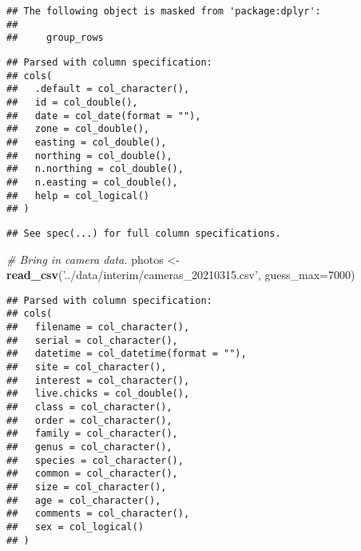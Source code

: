 \documentclass[
]{article}
\newenvironment{Shaded}{\begin{snugshade}}{\end{snugshade}}
\newcommand{\CommentTok}[1]{\textcolor[rgb]{0.56,0.35,0.01}{\textit{#1}}}
\newcommand{\DataTypeTok}[1]{\textcolor[rgb]{0.13,0.29,0.53}{#1}}
\newcommand{\DecValTok}[1]{\textcolor[rgb]{0.00,0.00,0.81}{#1}}
\newcommand{\KeywordTok}[1]{\textcolor[rgb]{0.13,0.29,0.53}{\textbf{#1}}}
\newcommand{\NormalTok}[1]{#1}
\newcommand{\OperatorTok}[1]{\textcolor[rgb]{0.81,0.36,0.00}{\textbf{#1}}}
\newcommand{\StringTok}[1]{\textcolor[rgb]{0.31,0.60,0.02}{#1}}
\begin{document}
\begin{verbatim}
## The following object is masked from 'package:dplyr':
## 
##     group_rows
\end{verbatim}

\begin{Shaded}
\end{Shaded}

\begin{verbatim}
## Parsed with column specification:
## cols(
##   .default = col_character(),
##   id = col_double(),
##   date = col_date(format = ""),
##   zone = col_double(),
##   easting = col_double(),
##   northing = col_double(),
##   n.northing = col_double(),
##   n.easting = col_double(),
##   help = col_logical()
## )
\end{verbatim}

\begin{verbatim}
## See spec(...) for full column specifications.
\end{verbatim}

\begin{Shaded}
\begin{Highlighting}[]
\CommentTok{# Bring in camera data.}
\NormalTok{photos <-}\StringTok{ }\KeywordTok{read_csv}\NormalTok{(}\StringTok{'../data/interim/cameras_20210315.csv'}\NormalTok{, }\DataTypeTok{guess_max=}\DecValTok{7000}\NormalTok{)}
\end{Highlighting}
\end{Shaded}

\begin{verbatim}
## Parsed with column specification:
## cols(
##   filename = col_character(),
##   serial = col_character(),
##   datetime = col_datetime(format = ""),
##   site = col_character(),
##   interest = col_character(),
##   live.chicks = col_double(),
##   class = col_character(),
##   order = col_character(),
##   family = col_character(),
##   genus = col_character(),
##   species = col_character(),
##   common = col_character(),
##   size = col_character(),
##   age = col_character(),
##   comments = col_character(),
##   sex = col_logical()
## )
\end{verbatim}
\end{document}
